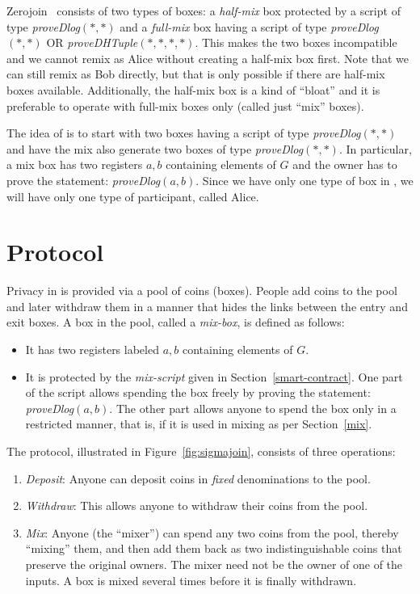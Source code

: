\documentclass[runningheads]{llncs}
\newcommand{\zerojoin}{Zerojoin\xspace}
\begin{document}
\zerojoin~\cite{zerojoin} consists of two types of boxes: a {\em half-mix} box protected by a script of type {\em proveDlog$(*, *)$} and a {\em full-mix} box having a script of type {\em proveDlog$(*, *)$} \textsf{OR} {\em proveDHTuple$(*, *, *, *)$}. This makes the two boxes incompatible and we cannot remix as Alice without creating a half-mix box first. Note that we can still remix as Bob directly, but that is only possible if there are half-mix boxes available. 
Additionally, the half-mix box is a kind of ``bloat'' and it is preferable to operate with full-mix boxes only (called just ``mix'' boxes).

The idea of \algname is to start with two boxes having a script of type {\em proveDlog$(*, *)$} and have the mix also generate two boxes of type {\em proveDlog$(*, *)$}. In particular, a mix box has two registers $a, b$ containing elements of $G$ and the owner has to prove the statement: {\em proveDlog$(a, b)$}. 
Since we have only one type of box in \algname, we will have only one type of participant, called Alice. 

\section{\algname Protocol}

Privacy in \algname is provided via a pool of coins (boxes). People add coins to the pool and later withdraw them in a manner that hides the links between the entry and exit boxes. 
A box in the pool, called a {\em mix-box}, is defined as follows:
\begin{itemize}
    \item It has two registers labeled $a, b$ containing elements of $G$.
    \item It is protected by the {\em mix-script} given in Section~\ref{smart-contract}. One part of the script allows spending the box freely by proving the statement: {\em proveDlog$(a,b)$}. The other part allows anyone to spend the box only in a restricted manner, that is, if it is used in mixing as per Section~\ref{mix}.
\end{itemize}

The protocol, illustrated in Figure~\ref{fig:sigmajoin}, consists of three operations:

\begin{enumerate}
    \item {\em Deposit}: Anyone can deposit coins in {\em fixed} denominations to the pool.
    \item {\em Withdraw}: This allows anyone to withdraw their coins from the pool. 
    \item {\em Mix}: Anyone (the ``mixer'') can spend any two coins from the pool, thereby ``mixing'' them, and then add them back as two indistinguishable coins that preserve the original owners. The mixer need not be the owner of one of the inputs.
    A box is mixed several times before it is finally withdrawn.
\end{enumerate}
\end{document}
